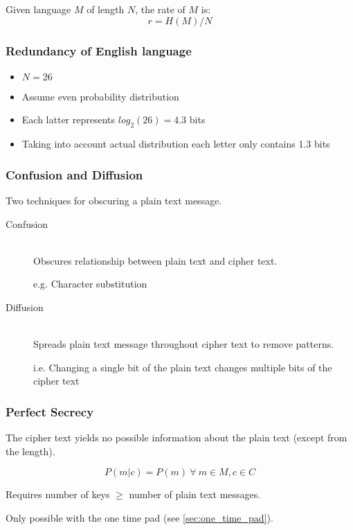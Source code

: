 \documentclass[a4paper]{article}
\begin{document}
Given language $M$ of length $N$, the rate of $M$ is:
\[
  r = H(M) / N
\]

\subsubsection{Redundancy of English language}

\begin{itemize}
  \item $N = 26$
  \item Assume even probability distribution
  \item Each latter represents $log_{2}(26) = 4.3$ bits
  \item Taking into account actual distribution each letter only contains 1.3
        bits
\end{itemize}

\subsubsection{Confusion and Diffusion}

Two techniques for obscuring a plain text message.

\begin{description}
  \item[Confusion] \hfill \\
    Obscures relationship between plain text and cipher text.

    e.g. Character substitution

  \item[Diffusion] \hfill \\
    Spreads plain text message throughout cipher text to remove patterns.

    i.e. Changing a single bit of the plain text changes multiple bits of the
    cipher text
\end{description}

\subsubsection{Perfect Secrecy}

The cipher text yields no possible information about the plain text (except from
the length).

\[
  P(m|c) = P(m) \: \forall \: m \in M, c \in C
\]

Requires number of keys $\geq$ number of plain text messages.

Only possible with the one time pad (see \ref{sec:one_time_pad}).
\end{document}

